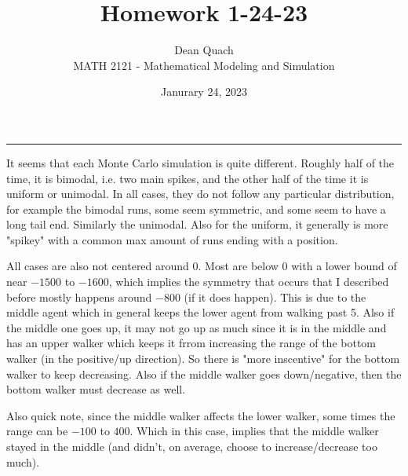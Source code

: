 \documentclass[12pt]{article}
\newenvironment{exercise}[2][Exercise]{\begin{trivlist}
\item[\hskip \labelsep {\bfseries #1}\hskip \labelsep {\bfseries #2.}]}{\end{trivlist}}
\begin{document}
 
 
 
\title{Homework 1-24-23}%
\author{Dean Quach\\ %
MATH 2121 - Mathematical Modeling and Simulation} %
\date{Janurary 24, 2023}
\maketitle

\hrule
\vspace{20pt}



\begin{exercise}{Analysis of (a)}
\end{exercise}

It seems that each Monte Carlo simulation is quite different. Roughly half of the time, it is bimodal, i.e. two main spikes, and the 
other half of the time it is uniform or unimodal. In all cases, they do not follow any particular distribution, 
for example the bimodal runs, some seem symmetric, and some seem to have a long tail end. Similarly the unimodal. 
Also for the uniform, it generally is more "spikey" with a common max amount of runs ending with a position.

All cases are also not centered around 0. Most are below 0 with a lower bound of near $-1500$ to $-1600$, which 
implies the symmetry that occurs that I described before mostly happens around $-800$ (if it does happen). 
This is due to the middle agent which in general keeps the lower agent from walking past 5. Also if the middle one goes up, it may 
not go up as much since it is in the middle and has an upper walker which keeps it frrom increasing the range of the bottom walker 
(in the positive/up direction). So there is "more inscentive" for the bottom walker to keep decreasing. Also if the middle walker goes 
down/negative, then the bottom walker must decrease as well.

Also quick note, since the middle walker affects the lower walker, some times the range can be 
$-100$ to $400$. Which in this case, implies that the middle walker stayed in the middle (and didn't, on average, choose to 
increase/decrease too much).
\end{document}
